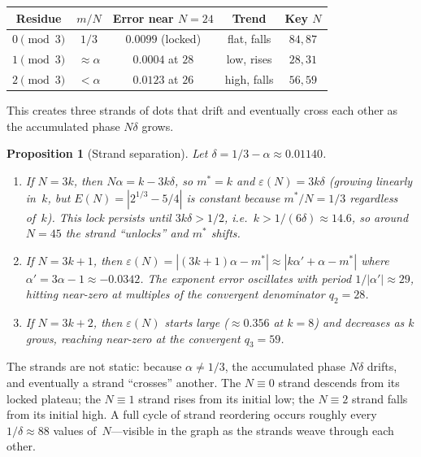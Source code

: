 \documentclass[12pt]{article}
\theoremstyle{plain}
\newtheorem{proposition}[theorem]{Proposition}
\theoremstyle{definition}
\theoremstyle{remark}
\numberwithin{equation}{section}
\begin{document}
\begin{center}
\renewcommand{\arraystretch}{1.3}
\begin{tabular}{ccccc}
\toprule
Residue & $m/N$ & Error near $N\!=\!24$ & Trend & Key $N$ \\
\midrule
$0\!\pmod{3}$ & $1/3$ & $0.0099$ (locked) & flat, falls & $84, 87$ \\
$1\!\pmod{3}$ & $\approx\alpha$ & $0.0004$ at $28$ & low, rises & $28, 31$ \\
$2\!\pmod{3}$ & $< \alpha$ & $0.0123$ at $26$ & high, falls & $56, 59$ \\
\bottomrule
\end{tabular}
\end{center}

\noindent
This creates three strands of dots that drift and eventually cross
each other as the accumulated phase $N\delta$ grows.

\begin{proposition}[Strand separation]\label{prop:strands}
Let $\delta = 1/3 - \alpha \approx 0.01140$.
\begin{enumerate}
\item If $N = 3k$, then $N\alpha = k - 3k\delta$, so $m^* = k$ and
  $\varepsilon(N) = 3k\delta$ (growing linearly in~$k$, but
  $E(N) = |2^{1/3} - 5/4|$ is constant because $m^*/N = 1/3$
  regardless of~$k$).  This lock persists until $3k\delta > 1/2$,
  i.e.\ $k > 1/(6\delta) \approx 14.6$, so around $N = 45$ the
  strand ``unlocks'' and $m^*$ shifts.
\item If $N = 3k+1$, then $\varepsilon(N) = |(3k+1)\alpha - m^*|
  \approx |k\alpha' + \alpha - m^*|$ where $\alpha' = 3\alpha - 1
  \approx -0.0342$.  The exponent error oscillates with period
  $1/|\alpha'| \approx 29$, hitting near-zero at multiples of
  the convergent denominator $q_2 = 28$.
\item If $N = 3k+2$, then $\varepsilon(N)$ starts large ($\approx 0.356$
  at $k = 8$) and decreases as $k$ grows, reaching near-zero at the
  convergent $q_3 = 59$.
\end{enumerate}
\end{proposition}

The strands are not static: because $\alpha \neq 1/3$, the accumulated
phase $N\delta$ drifts, and eventually a strand ``crosses''
another.  The $N \equiv 0$ strand descends from its locked plateau;
the $N \equiv 1$ strand rises from its initial low; the $N \equiv 2$
strand falls from its initial high.  A full cycle of strand reordering
occurs roughly every $1/\delta \approx 88$ values of~$N$---visible in
the graph as the strands weave through each other.
\end{document}
